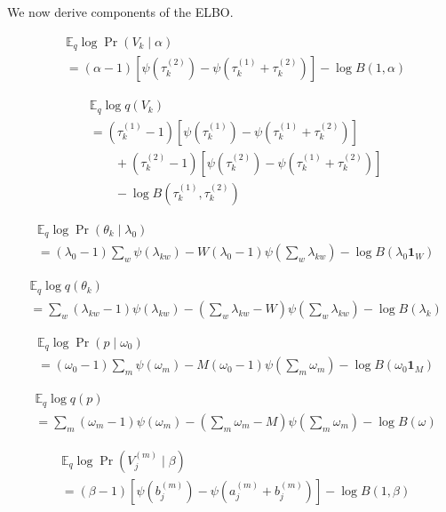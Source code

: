 \documentclass{article}
\newcommand{\one}{\ensuremath{\mathbf{1}}}
\newcommand{\digamma}[1]{\ensuremath{\psi\left(#1\right)}}
\newcommand{\Eq}{\ensuremath{\mathbb{E}_q\xspace}}
\begin{document}
We now derive components of the ELBO.

\begin{align*}
    &\Eq \log \Pr(V_k \mid \alpha) \\
    &= (\alpha - 1) \left[ \digamma{\tau_k^{(2)}} - \digamma{\tau_k^{(1)} + \tau_k^{(2)}} \right] - \log B(1, \alpha)
\end{align*}

\begin{align*}
    &\Eq \log q(V_k) \\
    &= (\tau_k^{(1)} - 1) \left[ \digamma{\tau_k^{(1)}} - \digamma{\tau_k^{(1)} + \tau_k^{(2)}} \right] \\
    &\qquad + (\tau_k^{(2)} - 1) \left[ \digamma{\tau_k^{(2)}} - \digamma{\tau_k^{(1)} + \tau_k^{(2)}} \right] \\
    &\qquad - \log B(\tau_k^{(1)}, \tau_k^{(2)})
\end{align*}

\begin{align*}
    &\Eq \log \Pr(\theta_k \mid \lambda_0) \\
    &= (\lambda_0 - 1) \sum_w \digamma{\lambda_{kw}} - W (\lambda_0 - 1) \digamma{\sum_w \lambda_{kw}} - \log B(\lambda_0 \one_W)
\end{align*}

\begin{align*}
    &\Eq \log q(\theta_k) \\
    &= \sum_w (\lambda_{kw} - 1) \digamma{\lambda_{kw}} - (\sum_w \lambda_{kw} - W) \digamma{\sum_w \lambda_{kw}} - \log B(\lambda_k)
\end{align*}

\begin{align*}
    &\Eq \log \Pr(p \mid \omega_0) \\
    &= (\omega_0 - 1) \sum_m \digamma{\omega_m} - M (\omega_0 - 1) \digamma{\sum_m \omega_m} - \log B(\omega_0 \one_M)
\end{align*}

\begin{align*}
    &\Eq \log q(p) \\
    &= \sum_m (\omega_m - 1) \digamma{\omega_m} - (\sum_m \omega_m - M) \digamma{\sum_m \omega_m} - \log B(\omega)
\end{align*}

\begin{align*}
    &\Eq \log \Pr(V_j^{(m)} \mid \beta) \\
    &= (\beta - 1) \left[ \digamma{b_j^{(m)}} - \digamma{a_j^{(m)} + b_j^{(m)}} \right] - \log B(1, \beta)
\end{align*}
\end{document}
